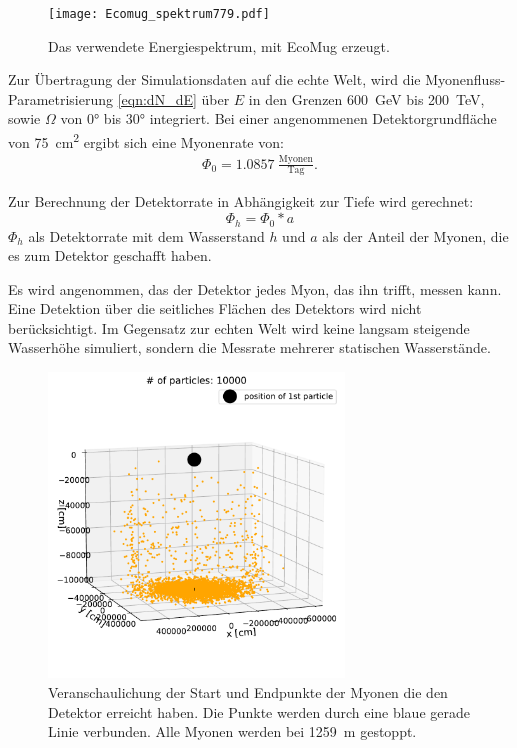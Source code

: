 \begin{figure}[]
    \centering
    \texttt{[image: Ecomug\_spektrum779.pdf]}
    \caption{Das verwendete Energiespektrum, mit EcoMug erzeugt.}
    \label{fig:ecomugplot}
\end{figure}



Zur Übertragung der Simulationsdaten auf die echte Welt, wird die 
Myonenfluss-Parametrisierung \eqref{eqn:dN_dE} über 
$E$ in den Grenzen \SI[]{600}[]{GeV} bis \SI[]{200}[]{TeV}, sowie
$\Omega$ von $0°$ bis $30°$ integriert.
Bei einer angenommenen Detektorgrundfläche von 
\SI[]{75}[]{cm^2} ergibt sich eine Myonenrate von:
\begin{align}
    \Phi_0 = 1.0857\:  \frac{\mathrm{Myonen}}{\mathrm{Tag}}.
\end{align}

Zur Berechnung der Detektorrate in Abhängigkeit zur Tiefe wird gerechnet:
\begin{equation}
    \Phi_h = \Phi_0 * a 
\end{equation}
$\Phi_h$ als Detektorrate mit dem Wasserstand $h$ und $a$ 
als der Anteil der Myonen, die es zum Detektor geschafft haben. 

Es wird angenommen, das der Detektor jedes Myon, das ihn trifft, messen kann.
Eine Detektion über die seitliches Flächen des Detektors wird nicht berücksichtigt.
Im Gegensatz zur echten Welt wird keine langsam steigende Wasserhöhe simuliert,
sondern die Messrate mehrerer statischen Wasserstände.

\begin{figure}[h]
    \centering
    \includegraphics[width=0.7\textwidth]{plot_3D_start_end.pdf}
    \caption{Veranschaulichung der Start und Endpunkte der Myonen die den Detektor erreicht haben.
    Die Punkte werden durch eine blaue gerade Linie verbunden. 
    Alle Myonen werden bei \SI[]{1259}[]{m} gestoppt.}
    \label{fig:3d-plot}
\end{figure}

